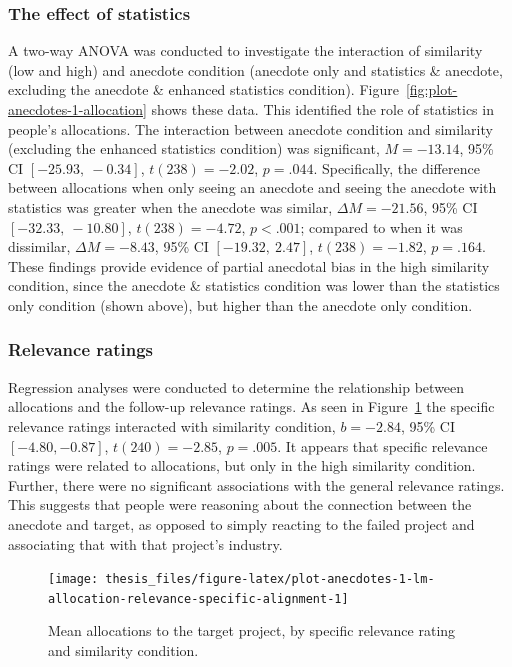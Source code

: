 \documentclass[a4paper, nobind, dvipsnames]{templates/ociamthesis}
\theoremstyle{definition}
\theoremstyle{definition}
\theoremstyle{definition}
\theoremstyle{definition}
\theoremstyle{remark}
\begin{document}
\subsubsection{The effect of statistics}

A two-way ANOVA was conducted to investigate the interaction of similarity (low
and high) and anecdote condition (anecdote only and statistics \& anecdote,
excluding the anecdote \& enhanced statistics condition).
Figure~\ref{fig:plot-anecdotes-1-allocation} shows these data. This identified
the role of statistics in people's allocations. The interaction between anecdote
condition and similarity (excluding the enhanced statistics condition) was
significant, \(M = -13.14\), 95\% CI \([-25.93,~-0.34]\), \(t(238) = -2.02\), \(p = .044\).
Specifically, the difference between allocations when only seeing an anecdote
and seeing the anecdote with statistics was greater when the anecdote was
similar,
\(\Delta M = -21.56\), 95\% CI \([-32.33,~-10.80]\), \(t(238) = -4.72\), \(p < .001\); compared to when it
was dissimilar, \(\Delta M = -8.43\), 95\% CI \([-19.32,~2.47]\), \(t(238) = -1.82\), \(p = .164\). These
findings provide evidence of partial anecdotal bias in the high similarity
condition, since the anecdote \& statistics condition was lower than the
statistics only condition (shown above), but higher than the anecdote only
condition.

\subsubsection{Relevance ratings}

Regression analyses were conducted to determine the relationship between
allocations and the follow-up relevance ratings. As seen in
Figure~\ref{fig:plot-anecdotes-1-lm-allocation-relevance-specific-alignment}
the specific relevance ratings interacted with similarity condition,
\(b = -2.84\), 95\% CI \([-4.80, -0.87]\), \(t(240) = -2.85\), \(p = .005\). It appears
that specific relevance ratings were related to allocations, but only in the
high similarity condition. Further, there were no significant associations with
the general relevance ratings. This suggests that people were reasoning about
the connection between the anecdote and target, as opposed to simply reacting to
the failed project and associating that with that project's industry.



\begin{figure}
\texttt{[image: thesis\_files/figure-latex/plot-anecdotes-1-lm-allocation-relevance-specific-alignment-1]} \caption{Mean allocations to the target project, by specific relevance rating and similarity condition.}\label{fig:plot-anecdotes-1-lm-allocation-relevance-specific-alignment}
\end{figure}
\end{document}

